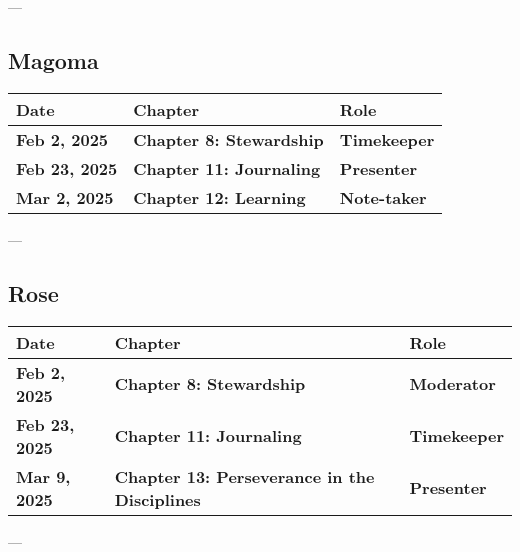 \documentclass[10pt]{article}
\begin{document}
---

\subsection*{Magoma}
\begin{tcolorbox}[colframe=blue!40, colback=yellow!10, coltitle=black, sharp corners=south, boxrule=0.4mm, width=\textwidth-2mm]
\renewcommand{\arraystretch}{1.5} %
\begin{longtable}{|@{}p{2.5cm}|@{}p{3.5cm}|@{}p{2.5cm}|}
\hline
\textbf{Date} & \textbf{Chapter} & \textbf{Role} \\
\hline
\endhead
\hline
\endlastfoot
\textbf{Feb 2, 2025} & \textbf{Chapter 8: Stewardship} & \textbf{Timekeeper} \\
\hline
\textbf{Feb 23, 2025} & \textbf{Chapter 11: Journaling} & \textbf{Presenter} \\
\hline
\textbf{Mar 2, 2025} & \textbf{Chapter 12: Learning} & \textbf{Note-taker} \\
\hline
\end{longtable}
\end{tcolorbox}

---

\subsection*{Rose}
\begin{tcolorbox}[colframe=blue!40, colback=yellow!10, coltitle=black, sharp corners=south, boxrule=0.4mm, width=\textwidth-2mm]
\renewcommand{\arraystretch}{1.5} %
\begin{longtable}{|@{}p{2.5cm}|@{}p{3.5cm}|@{}p{2.5cm}|}
\hline
\textbf{Date} & \textbf{Chapter} & \textbf{Role} \\
\hline
\endhead
\hline
\endlastfoot
\textbf{Feb 2, 2025} & \textbf{Chapter 8: Stewardship} & \textbf{Moderator} \\
\hline
\textbf{Feb 23, 2025} & \textbf{Chapter 11: Journaling} & \textbf{Timekeeper} \\
\hline
\textbf{Mar 9, 2025} & \textbf{Chapter 13: Perseverance in the Disciplines} & \textbf{Presenter} \\
\hline
\end{longtable}
\end{tcolorbox}

---
\end{document}
